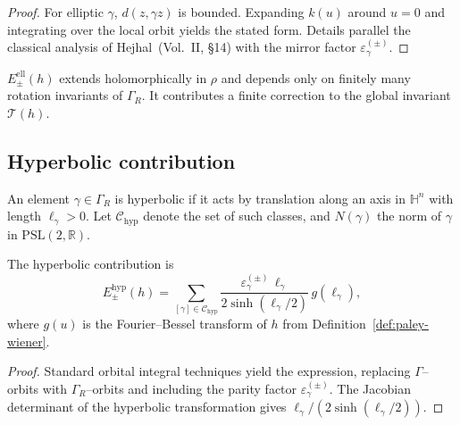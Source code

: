 \begin{proof}
For elliptic $\gamma$, $d(z,\gamma z)$ is bounded.  
Expanding $k(u)$ around $u=0$ and integrating over the local orbit yields the stated form.  
Details parallel the classical analysis of Hejhal~(Vol.~II, §14) with the mirror factor $\varepsilon_\gamma^{(\pm)}$. %
\end{proof}

\begin{remark}
\label{rem:elliptic-analytic}
$E_\pm^{\mathrm{ell}}(h)$ extends holomorphically in $\rho$ and depends only on finitely many rotation invariants of $\Gamma_R$.  
It contributes a finite correction to the global invariant $\mathcal{T}(h)$. %
\end{remark}

\subsection{Hyperbolic contribution}
\label{subsec:ch6-part5-hyperbolic} \relax

\begin{definition}
\label{def:hyperbolic-class}
An element $\gamma\in\Gamma_R$ is hyperbolic if it acts by translation along an axis in $\mathbb{H}^n$ with length $\ell_\gamma>0$.  
Let $\mathcal{C}_{\mathrm{hyp}}$ denote the set of such classes, and $N(\gamma)$ the norm of $\gamma$ in $\mathrm{PSL}(2,\mathbb{R})$. %
\end{definition}

\begin{lemma}
\label{lem:hyperbolic-term}
The hyperbolic contribution is
\[
E_\pm^{\mathrm{hyp}}(h)
=\sum_{[\gamma]\in\mathcal{C}_{\mathrm{hyp}}}
\frac{\varepsilon_\gamma^{(\pm)}\,\ell_\gamma}{2\sinh(\ell_\gamma/2)}\,g(\ell_\gamma),
\]
where $g(u)$ is the Fourier–Bessel transform of $h$ from Definition~\ref{def:paley-wiener}. %
\end{lemma}

\begin{proof}
Standard orbital integral techniques yield the expression, replacing $\Gamma$–orbits with $\Gamma_R$–orbits and including the parity factor $\varepsilon_\gamma^{(\pm)}$.  
The Jacobian determinant of the hyperbolic transformation gives $\ell_\gamma/(2\sinh(\ell_\gamma/2))$. %
\end{proof}

